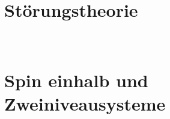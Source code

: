 \documentclass{article}
\begin{document}
    \section{Störungstheorie}
        
        
        
        

    \clearpage
    \thispagestyle{empty}
    \newpage
    \ 
    \thispagestyle{empty}
    \newpage
    \section{Spin einhalb und Zweiniveausysteme}    
        
    \newpage
    
\end{document}
